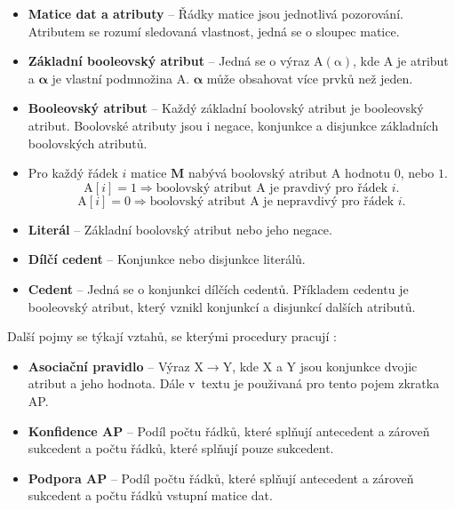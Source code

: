 \begin{itemize}
    \itemsep0em
    \item \textbf{Matice dat a atributy} -- Řádky matice jsou jednotlivá pozorování. Atributem se rozumí sledovaná vlastnost, jedná se o sloupec matice.
    \item \textbf{Základní booleovský atribut} -- Jedná se o výraz $\bm{\mathrm{A(\alpha)}}$, kde $\bm{\mathrm{A}}$ je atribut a  $\bm{\alpha}$ je vlastní podmnožina $\bm{\mathrm{A}}$. $\bm{\alpha}$ může obsahovat více prvků než jeden.
    \item \textbf{Booleovský atribut} -- Každý základní boolovský atribut je booleovský atribut. Boolovské atributy jsou i negace, konjunkce a disjunkce základních boolovských atributů. 
    \item[] Pro každý řádek $i$ matice $\mathbf{M}$ nabývá boolovský atribut  $\bm{\mathrm{A}}$ hodnotu $0$, nebo $1$.
    \begin{equation*}
    \bm{\mathrm{A}}\left[i\right] = 1 \Rightarrow \mbox{boolovský atribut } \bm{\mathrm{A}} \mbox{ je pravdivý pro řádek } i.
    \end{equation*}
    \begin{equation*}
        \bm{\mathrm{A}}\left[i\right] = 0 \Rightarrow \mbox{boolovský atribut } \bm{\mathrm{A}} \mbox{ je nepravdivý pro řádek } i.
        \end{equation*}

    \item \textbf{Literál} -- Základní boolovský atribut nebo jeho negace.
    \item \textbf{Dílčí cedent} -- Konjunkce nebo disjunkce literálů.
    \item \textbf{Cedent} -- Jedná se o konjunkci dílčích cedentů. Příkladem cedentu je booleovský atribut, který vznikl konjunkcí a disjunkcí dalších atributů.

\end{itemize}


Další pojmy se týkají vztahů, se kterými procedury pracují \cite{bib:GUHA}:

\begin{itemize}
    \itemsep0em
    \item \textbf{Asociační pravidlo} -- Výraz $\mathrm{X} \rightarrow \mathrm{Y}$, kde $\mathrm{X}$ a $\mathrm{Y}$ jsou konjunkce dvojic atribut a jeho hodnota. Dále v~textu je použivaná pro tento pojem zkratka AP.
    \item \textbf{Konfidence AP} -- Podíl počtu řádků, které splňují antecedent a zároveň sukcedent a počtu řádků, které splňují pouze sukcedent.
    \item \textbf{Podpora AP} -- Podíl počtu řádků, které splňují antecedent a zároveň sukcedent a počtu řádků vstupní matice dat.
\end{itemize}

